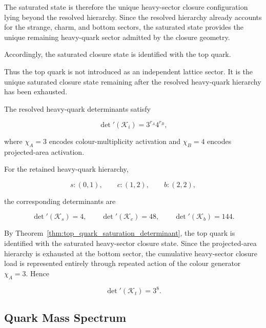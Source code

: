 \documentclass[11pt]{article}
\theoremstyle{definition}
\theoremstyle{remark}
\begin{document}
The saturated state is therefore the unique heavy-sector closure
configuration lying beyond the resolved hierarchy. Since the
resolved hierarchy already accounts for the strange, charm, and
bottom sectors, the saturated state provides the unique
remaining heavy-quark sector admitted by the closure geometry.

Accordingly, the saturated closure state is identified with the
top quark.

Thus the top quark is not introduced as an independent lattice
sector. It is the unique saturated closure state remaining after
the resolved heavy-quark hierarchy has been exhausted.


The resolved heavy-quark determinants satisfy

\begin{equation}
\det{}'(\mathcal K_i)
=
3^{r_A}4^{r_B},
\label{eq:heavy_determinant_rule}
\end{equation}

where \(\chi_A=3\) encodes colour-multiplicity activation and
\(\chi_B=4\) encodes projected-area activation.

For the retained heavy-quark hierarchy,

\begin{equation}
s:(0,1),
\qquad
c:(1,2),
\qquad
b:(2,2),
\end{equation}

the corresponding determinants are

\begin{equation}
\det{}'(\mathcal K_s)=4,
\qquad
\det{}'(\mathcal K_c)=48,
\qquad
\det{}'(\mathcal K_b)=144.
\end{equation}

By Theorem~\ref{thm:top_quark_saturation_determinant}, the top
quark is identified with the saturated heavy-sector closure
state. Since the projected-area hierarchy is exhausted at the
bottom sector, the cumulative heavy-sector closure load is
represented entirely through repeated action of the colour
generator \(\chi_A=3\). Hence

\begin{equation}
\det{}'(\mathcal K_t)
=
3^8.
\label{eq:top_determinant_from_cumulative_load}
\end{equation}


\subsection{Quark Mass Spectrum}
\label{subsec:quark_mass_spectrum}
\end{document}
